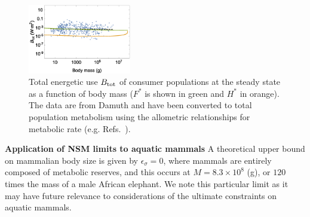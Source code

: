 \documentclass[twocolumn,preprintnumbers,amsmath,amssymb,superscriptaddress]{revtex4}
\begin{document}
\begin{figure}[h!]
\centering
\includegraphics[width=0.4\textwidth]{fig_FPenergyequiv.eps}
\caption{\small{ Total energetic use $B_{\rm tot}$ of consumer populations at the steady state as a function of body mass ($F^*$ is shown in green and $H^*$ in orange).  The data are from Damuth \citep{Damuth:1987kr} and have been converted to
  total population metabolism using the allometric relationships for
  metabolic rate (e.g. Refs.~\citep{West:2001bv,hou,moses2008rmo}).}\label{fig:equivalence}}
\end{figure}

{\bf Application of NSM limits to aquatic mammals}
A theoretical upper bound on mammalian body size is given by $\epsilon_\sigma=0$, where mammals are entirely composed of metabolic reserves, and this occurs at $M=8.3\times 10^8$ (g), or $120$ times the mass of a male African elephant. We note this particular limit as it may have future relevance to considerations of the ultimate constraints on aquatic mammals.


\def\bibfont{\footnotesize}
\end{document}
